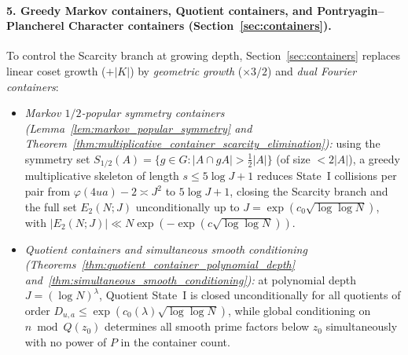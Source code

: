 \documentclass[11pt, a4paper]{article}
\theoremstyle{plain}
\theoremstyle{definition}
\begin{document}
\paragraph{5. Greedy Markov containers, Quotient containers, and Pontryagin--Plancherel Character containers (Section~\ref{sec:containers}).}
To control the Scarcity branch at growing depth, Section~\ref{sec:containers} replaces linear coset growth ($+|K|$) by \emph{geometric growth} ($\times 3/2$) and \emph{dual Fourier containers}:
\begin{itemize}
    \item \emph{Markov $1/2$-popular symmetry containers (Lemma~\ref{lem:markov_popular_symmetry} and Theorem~\ref{thm:multiplicative_container_scarcity_elimination}):} using the symmetry set $S_{1/2}(A)=\{g\in G:|A\cap gA|>\frac12|A|\}$ (of size $<2|A|$), a greedy multiplicative skeleton of length $s\le 5\log J+1$ reduces State~I collisions per pair from $\varphi(4ua)-2\asymp J^{2}$ to $5\log J+1$, closing the Scarcity branch and the full set $E_2(N;J)$ unconditionally up to $J=\exp(c_0\sqrt{\log\log N})$, with $|E_2(N;J)|\ll N\exp(-\exp(c\sqrt{\log\log N}))$.
    \item \emph{Quotient containers and simultaneous smooth conditioning (Theorems~\ref{thm:quotient_container_polynomial_depth} and~\ref{thm:simultaneous_smooth_conditioning}):} at polynomial depth $J=(\log N)^{\lambda}$, Quotient State~I is closed unconditionally for all quotients of order $D_{u,a}\le\exp(c_0(\lambda)\sqrt{\log\log N})$, while global conditioning on $n\bmod Q(z_0)$ determines all smooth prime factors below $z_0$ simultaneously with no power of $P$ in the container count.

\end{itemize}
\end{document}
